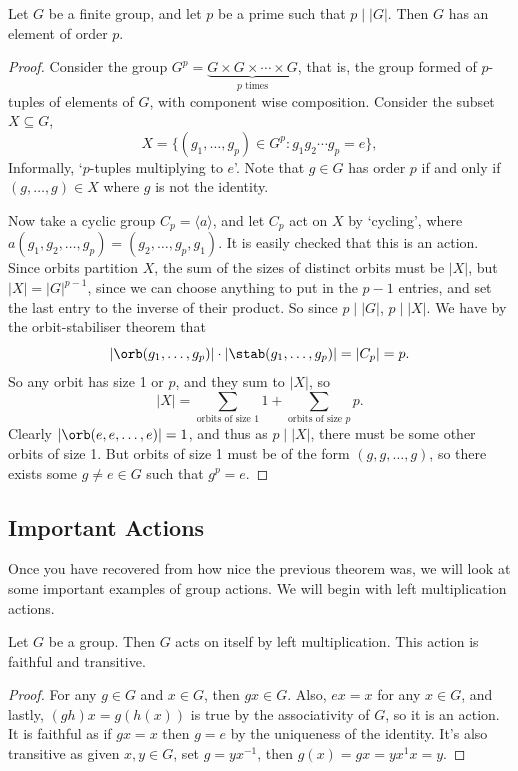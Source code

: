 \documentclass[a4paper]{scrartcl}
\begin{document}
\begin{theorem}
	Let $G$ be a finite group, and let $p$ be a prime such that $p \mid |G|$. Then $G$ has an element of order $p$.
\end{theorem}
\begin{proof}
	Consider the group $G^p = \underbrace{G\times G \times \cdots \times G}_{p\text{ times}}$, that is, the group formed of $p$-tuples of elements of $G$, with component wise composition. Consider the subset $X \subseteq G$,
	$$
	X = \{(g_1, \dots, g_p) \in G^p : g_1 g_2 \cdots g_p = e\},
	$$
	Informally, `$p$-tuples multiplying to $e$'. Note that $g \in G$ has order $p$ if and only if $(g, \dots, g) \in X$ where $g$ is not the identity.

	Now take a cyclic group $C_p = \langle a \rangle$, and let $C_p$ act on $X$ by `cycling', where $a(g_1, g_2, \dots, g_p) = (g_2, \dots, g_p, g_1)$. It is easily checked that this is an action.
	Since orbits partition $X$, the sum of the sizes of distinct orbits must be $|X|$, but $|X| = |G|^{p - 1}$, since we can choose anything to put in the $p - 1$ entries, and set the last entry to the inverse of their product. So since $p \mid |G|$, $p \mid |X|$. We have by the orbit-stabiliser theorem that
	$$
	|\orb(g_1, \dots, g_p)| \cdot |\stab(g_1, \dots, g_p)| = |C_p| = p.
	$$
	So any orbit has size 1 or $p$, and they sum to $|X|$, so
	$$
	|X| = \sum_{\text{orbits of size 1}} 1 + \sum_{\text{orbits of size $p$}} p.
	$$
	Clearly $|\orb(e, e, \dots, e)| = 1$, and thus as $p \mid |X|$, there must be some other orbits of size 1.
	But orbits of size 1 must be of the form $(g, g, \dots, g)$, so there exists some $g \neq e \in G$ such that $g^p = e$.
\end{proof}

\subsection{Important Actions}

Once you have recovered from how nice the previous theorem was, we will look at some important examples of group actions. We will begin with left multiplication actions.

\begin{lemma}
	Let $G$ be a group. Then $G$ acts on itself by left multiplication. This action is faithful and transitive.
\end{lemma}
\begin{proof}
	For any $g \in G$ and $x \in G$, then $gx \in G$. Also, $ex = x$ for any $x \in G$, and lastly, $(gh)x = g(h(x))$ is true by the associativity of $G$, so it is an action. It is faithful as if $gx = x$ then $g = e$ by the uniqueness of the identity. It's also transitive as given $x, y \in G$, set $g = yx^{-1}$, then $g(x) = gx = yx^{1}x = y$. 
\end{proof}
\end{document}
